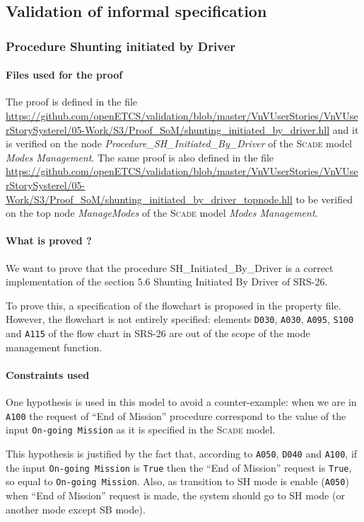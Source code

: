 \documentclass{article}
\newcommand{\SCADE}{\textsc{Scade}}
\begin{document}
\subsection{Validation of informal specification}

\subsubsection{Procedure Shunting initiated by Driver}

\paragraph{Files used for the proof} The proof is defined in the file \url{https://github.com/openETCS/validation/blob/master/VnVUserStories/VnVUserStorySysterel/05-Work/S3/Proof_SoM/shunting_initiated_by_driver.hll} and it is verified on the node \emph{Procedure\_SH\_Initiated\_By\_Driver} of the \SCADE{} model \emph{Modes Management}. The same proof is also defined in the file \url{https://github.com/openETCS/validation/blob/master/VnVUserStories/VnVUserStorySysterel/05-Work/S3/Proof_SoM/shunting_initiated_by_driver_topnode.hll} to be verified on the top node \emph{ManageModes} of the \SCADE{} model \emph{Modes Management}.

\paragraph{What is proved ?}
We want to prove that the procedure SH\_Initiated\_By\_Driver is a
correct implementation of the section 5.6 Shunting Initiated By Driver of SRS-26.

To prove this, a specification of the flowchart is proposed in the
property file. However, the flowchart is not entirely specified:
elements \texttt{D030}, \texttt{A030}, \texttt{A095}, \texttt{S100} and
\texttt{A115} of the flow chart in SRS-26 are out of the scope of the mode management function.

\paragraph{Constraints used}
One hypothesis is used in this model to avoid a counter-example: when we are in \texttt{A100} the request of ``End of
Mission'' procedure correspond to the value of the input
\texttt{On-going Mission} as it is specified in the \SCADE{} model.

This hypothesis is justified by the fact that, according to
\texttt{A050}, \texttt{D040} and \texttt{A100}, if the input
\texttt{On-going Mission} is \texttt{True} then the ``End of Mission''
request is \texttt{True}, so equal to \texttt{On-going Mission}. Also,
as transition to SH mode is enable (\texttt{A050}) when ``End of
Mission'' request is made, the system should go to SH mode (or another
mode except SB mode). 
\end{document}
